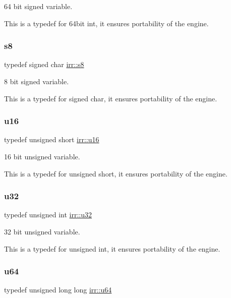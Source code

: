 64 bit signed variable. 

This is a typedef for 64bit int, it ensures portability of the engine. \mbox{\label{namespaceirr_adc3ec66d7537550be0fea1c9eeadd63d}} 
\subsubsection{\texorpdfstring{s8}{s8}}
{\footnotesize\ttfamily typedef signed char \hyperlink{namespaceirr_adc3ec66d7537550be0fea1c9eeadd63d}{irr\+::s8}}



8 bit signed variable. 

This is a typedef for signed char, it ensures portability of the engine. \mbox{\label{namespaceirr_ae9f8ec82692ad3b83c21f555bfa70bcc}} 
\subsubsection{\texorpdfstring{u16}{u16}}
{\footnotesize\ttfamily typedef unsigned short \hyperlink{namespaceirr_ae9f8ec82692ad3b83c21f555bfa70bcc}{irr\+::u16}}



16 bit unsigned variable. 

This is a typedef for unsigned short, it ensures portability of the engine. \mbox{\label{namespaceirr_a0416a53257075833e7002efd0a18e804}} 
\subsubsection{\texorpdfstring{u32}{u32}}
{\footnotesize\ttfamily typedef unsigned int \hyperlink{namespaceirr_a0416a53257075833e7002efd0a18e804}{irr\+::u32}}



32 bit unsigned variable. 

This is a typedef for unsigned int, it ensures portability of the engine. \mbox{\label{namespaceirr_a9701cac11d289143453e212684075af7}} 
\subsubsection{\texorpdfstring{u64}{u64}}
{\footnotesize\ttfamily typedef unsigned long long \hyperlink{namespaceirr_a9701cac11d289143453e212684075af7}{irr\+::u64}}



